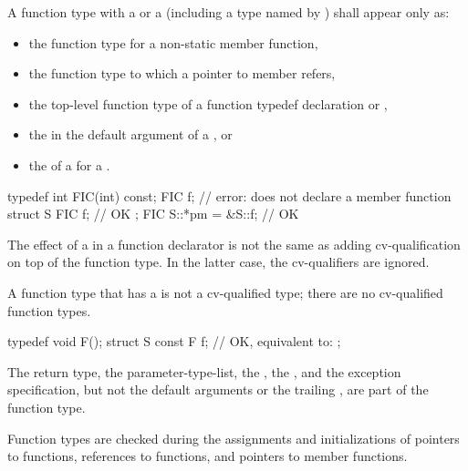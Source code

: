 \pnum
A function type with a  or a
 (including a type named by
)
shall appear only as:
\begin{itemize}
\item the function type for a non-static member function,

\item the function type to which a pointer to member refers,

\item the top-level function type of a function typedef declaration
or ,

\item the  in the default argument of a
, or

\item the  of a  for a
.
\end{itemize}
\begin{example}
\begin{codeblock}
typedef int FIC(int) const;
FIC f;              // error: does not declare a member function
struct S {
  FIC f;            // OK
};
FIC S::*pm = &S::f; // OK
\end{codeblock}
\end{example}

\pnum
The effect of a
in a function declarator is not the same as
adding cv-qualification on top of the function type.
In the latter case, the cv-qualifiers are ignored.
\begin{note}
A function type that has a  is not a
cv-qualified type; there are no cv-qualified function types.
\end{note}
\begin{example}
\begin{codeblock}
typedef void F();
struct S {
  const F f;        // OK, equivalent to: 
};
\end{codeblock}
\end{example}

\pnum
The return type, the parameter-type-list, the ,
the , and
the exception specification,
but not the default arguments
or the trailing ,
are part of the function type.
\begin{note}
Function types are checked during the assignments and initializations of
pointers to functions, references to functions, and pointers to member functions.
\end{note}

